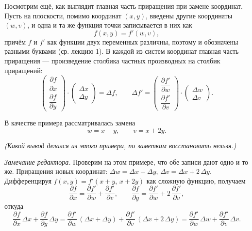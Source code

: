 \documentclass[11pt,a4paper]{article}
\begin{document}
Посмотрим ещё, как выглядит главная часть приращения при замене координат. Пусть на плоскости, помимо координат $(x, y)$, введены другие координаты $(w, v)$, и одна и та же функция точки записывается в них как
\[
f(x, y) = f'(w, v),
\]
причём $f$ и $f'$ как функции двух переменных различны, поэтому и обозначены разными буквами (ср. лекцию 1). В каждой из систем координат главная часть приращения — произведение столбика частных производных на столбик приращений:
\[
\begin{pmatrix} \dfrac{\partial f}{\partial x} \\[8pt] \dfrac{\partial f}{\partial y} \end{pmatrix} \cdot \begin{pmatrix} \Delta x \\[8pt] \Delta y \end{pmatrix} = \Delta f, \qquad
\Delta f' = \begin{pmatrix} \dfrac{\partial f'}{\partial w} \\[8pt] \dfrac{\partial f'}{\partial v} \end{pmatrix} \cdot \begin{pmatrix} \Delta w \\[8pt] \Delta v \end{pmatrix}.
\]

В качестве примера рассматривалась замена
\[
w = x + y, \qquad v = x + 2y.
\]

\emph{(Какой вывод делался из этого примера, по заметкам восстановить нельзя.)}


\emph{Замечание редактора.} Проверим на этом примере, что обе записи дают одно и то же. Приращения новых координат: $\Delta w = \Delta x + \Delta y$, $\Delta v = \Delta x + 2\,\Delta y$. Дифференцируя $f(x, y) = f'(x + y,\, x + 2y)$ как сложную функцию, получаем
\[
\frac{\partial f}{\partial x} = \frac{\partial f'}{\partial w} + \frac{\partial f'}{\partial v}, \qquad \frac{\partial f}{\partial y} = \frac{\partial f'}{\partial w} + 2\,\frac{\partial f'}{\partial v},
\]
откуда
\[
\frac{\partial f}{\partial x}\,\Delta x + \frac{\partial f}{\partial y}\,\Delta y = \frac{\partial f'}{\partial w}\,(\Delta x + \Delta y) + \frac{\partial f'}{\partial v}\,(\Delta x + 2\,\Delta y) = \frac{\partial f'}{\partial w}\,\Delta w + \frac{\partial f'}{\partial v}\,\Delta v.
\]
\end{document}
